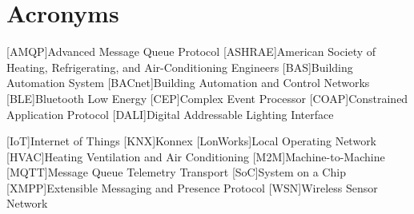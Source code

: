 \chapter{Acronyms}

\footnotesize
\SingleSpacing

\begin{multicols}{2}
\begin{acronym}[AAAAAA]

	[AMQP]{Advanced Message Queue Protocol}
	[ASHRAE]{American Society of Heating, Refrigerating, and Air-Conditioning Engineers}
	[BAS]{Building Automation System}
	[BACnet]{Building Automation and Control Networks}
	[BLE]{Bluetooth Low Energy}
	[CEP]{Complex Event Processor}
	[COAP]{Constrained Application Protocol}
	[DALI]{Digital Addressable Lighting Interface}
	
	[IoT]{Internet of Things}
	[KNX]{Konnex}
	[LonWorks]{Local Operating Network}
	[HVAC]{Heating Ventilation and Air Conditioning}
	[M2M]{Machine-to-Machine}
	[MQTT]{Message Queue Telemetry Transport}
	[SoC]{System on a Chip}
	[XMPP]{Extensible Messaging and Presence Protocol}
	[WSN]{Wireless Sensor Network}
	


\end{acronym}
\end{multicols}

